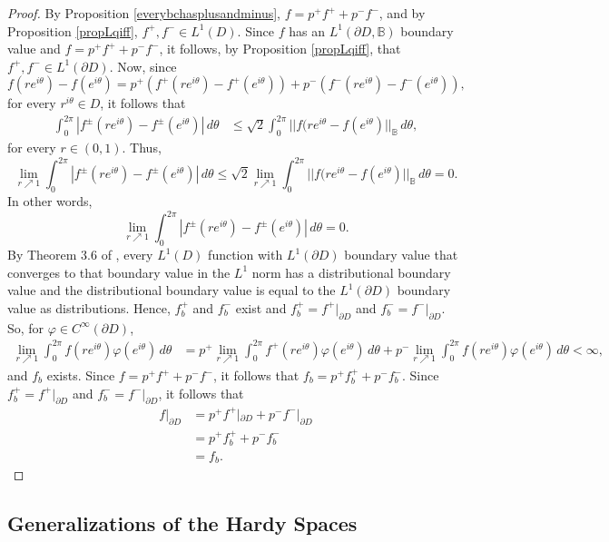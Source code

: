 \documentclass[suppldata]{interact}
\theoremstyle{plain}%
\theoremstyle{definition}
\theoremstyle{remark}
\newcommand{\p}{\partial}
\newcommand{\bc}{\mathbb{B}}
\begin{document}
\begin{proof}
By Proposition \ref{everybchasplusandminus}, $f = p^+ f^+ + p^- f^-$, and by Proposition \ref{propLqiff}, $f^+, f^- \in L^1(D)$. Since $f$ has an $L^1(\p D, \mathbb{B})$ boundary value and $f = p^+ f^+ + p^- f^-$, it follows, by Proposition \ref{propLqiff}, that $f^+, f^- \in L^1(\p D)$. Now, since 
\[
    f(re^{i\theta}) - f(e^{i\theta}) = p^+ (f^+(re^{i\theta}) - f^+(e^{i\theta})) + p^- (f^-(re^{i\theta}) - f^-(e^{i\theta})),
\]
for every $r^{i\theta} \in D$, it follows that 
\begin{align*}
\int_0^{2\pi} |f^\pm (re^{i\theta}) - f^\pm(e^{i\theta})|\,d\theta
&\leq \sqrt{2} \int_0^{2\pi} ||f(re^{i\theta} - f(e^{i\theta})||_{\bc}\,d\theta ,
\end{align*}
for every $r \in (0,1)$. Thus, 
\[
    \lim_{r \nearrow 1}\int_0^{2\pi} |f^\pm (re^{i\theta}) - f^\pm(e^{i\theta})|\,d\theta
\leq \sqrt{2} \lim_{r \nearrow 1}\int_0^{2\pi} ||f(re^{i\theta} - f(e^{i\theta})||_{\bc}\,d\theta  =0.
\]
In other words, 
\[
\lim_{r \nearrow 1}\int_0^{2\pi} |f^\pm (re^{i\theta}) - f^\pm(e^{i\theta})|\,d\theta = 0.
\]
By Theorem 3.6 of \cite{WB3}, every $L^1(D)$ function with $L^1(\p D)$ boundary value that converges to that boundary value in the $L^1$ norm has a distributional boundary value and the distributional boundary value is equal to the $L^1(\p D)$ boundary value as distributions. Hence, $f^+_b$ and $f^-_b$ exist and $f^+_b=f^+|_{\p D}$ and $f^-_b=f^-|_{\p D}$. So, for $\varphi \in C^\infty(\p D)$, 
\begin{align*}
    \lim_{r\nearrow 1} \int_0^{2\pi} f(re^{i\theta}) \varphi(e^{i\theta}) \,d\theta 
    &= p^+\lim_{r\nearrow 1} \int_0^{2\pi} f^+(re^{i\theta}) \varphi(e^{i\theta}) \,d\theta + p^- \lim_{r\nearrow 1} \int_0^{2\pi} f(re^{i\theta}) \varphi(e^{i\theta}) \,d\theta < \infty,
\end{align*}
and $f_b$ exists. Since $f = p^+ f^+ + p^- f^-$, it follows that $f_b = p^+ f^+_b + p^- f^-_b$. Since $f^+_b=f^+|_{\p D}$ and $f^-_b=f^-|_{\p D}$, it follows that 
\begin{align*}
    f|_{\p D} &= p^+ f^+|_{\p D} + p^- f^-|_{\p D} \\
    &= p^+ f^+_b + p^- f^-_b\\
    &= f_b.
\end{align*}
\end{proof}







\subsection{Generalizations of the Hardy Spaces}
\end{document}
